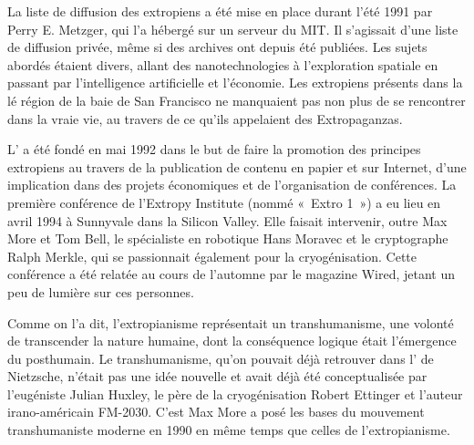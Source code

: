 La liste de diffusion des extropiens a été mise en place durant l'été 1991 par Perry E. Metzger, qui l'a hébergé sur un serveur du MIT. Il s'agissait d'une liste de diffusion privée, même si des archives ont depuis été publiées. Les sujets abordés étaient divers, allant des nanotechnologies à l'exploration spatiale en passant par l'intelligence artificielle et l'économie. Les extropiens présents dans la lé région de la baie de San Francisco ne manquaient pas non plus de se rencontrer dans la vraie vie, au travers de ce qu'ils appelaient des Extropaganzas.

L' a été fondé en mai 1992 dans le but de faire la promotion des principes extropiens au travers de la publication de contenu en papier et sur Internet, d'une implication dans des projets économiques et de l'organisation de conférences. La première conférence de l'Extropy Institute (nommé «~Extro 1~») a eu lieu en avril 1994 à Sunnyvale dans la Silicon Valley. Elle faisait intervenir, outre Max More et Tom Bell, le spécialiste en robotique Hans Moravec et le cryptographe Ralph Merkle, qui se passionnait également pour la cryogénisation. Cette conférence a été relatée au cours de l'automne par le magazine Wired, jetant un peu de lumière sur ces personnes.

Comme on l'a dit, l'extropianisme représentait un transhumanisme, une volonté de transcender la nature humaine, dont la conséquence logique était l'émergence du posthumain. Le transhumanisme, qu'on pouvait déjà retrouver dans l' de Nietzsche, n'était pas une idée nouvelle et avait déjà été conceptualisée par l'eugéniste Julian Huxley, le père de la cryogénisation Robert Ettinger et l'auteur irano-américain FM-2030. C'est Max More a posé les bases du mouvement transhumaniste moderne en 1990 en même temps que celles de l'extropianisme. %

